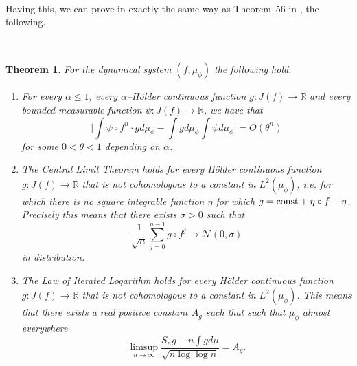 \documentclass[12pt]{amsart}
\numberwithin{equation}{section}
\newcommand{\nl}{\newline}
\newtheorem{thm}{Theorem}[section]
\def\sp{\medskip}             \def\fr{\noindent}        \def\nl{\newline}
\begin{document}
\

\fr Having this, we can prove in exactly the same way as Theorem~56
in \cite{SUZ1}, the following. 

\

\begin{thm}\label{t220110627}
For the dynamical system $(f,\mu_\phi)$ the following hold.
\begin{enumerate}
\item{} For every $\alpha\le 1$, every $\alpha$--H\"older continuous
  function $g:J(f)\to \mathbb{R}$ and every bounded measurable
  function $\psi:J(f)\to\mathbb{R}$, we have that
$$
\bigg|\int\psi\circ f^n \cdot g d\mu_\phi
-\int g d\mu_\phi\int\psi d\mu_\phi\bigg|
=O(\theta^n)
$$
for some $0<\theta<1$ depending on $\alpha$.

\sp\item{} The Central Limit Theorem holds for every H\"older continuous
  function $g:J(f)\to  \mathbb{R}$ that is not
  cohomologous to a constant in $L^2(\mu_\phi)$, i.e. for which there is no
  square integrable function $\eta$ for which $g={\rm
    const}+\eta\circ f-\eta$. Precisely this means that
 there exists $\sigma>0$ such that
$$
\frac{1}{\sqrt{n}}{\sum_{j=0}^{n-1}g\circ f^j} \to \mathcal N(0,\sigma)
$$ 
in distribution.
\sp\item{} The Law of Iterated Logarithm holds for every H\"older continuous
function $g:J(f)\to \mathbb{R}$ that is not cohomologous to a constant
in $L^2(\mu_\phi)$. This means that there exists a real positive
constant $A_g$ such that such that $\mu_\phi$ almost everywhere 
$$
\limsup_{n\to\infty}\frac{S_{n}g-n\int gd\mu}{\sqrt{n\log\log n}}=A_g. 
$$
\end{enumerate}
\end{thm}
\end{document}

